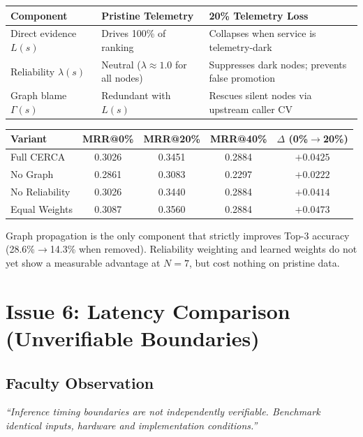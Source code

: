 \documentclass[11pt,a4paper]{article}
\newcommand{\tb}[1]{\textbf{#1}}
\begin{document}
\begin{center}\footnotesize
\begin{tabular}{|L{3.8cm}|L{4.0cm}|L{5.6cm}|}
\hline
\tb{Component} & \tb{Pristine Telemetry} & \tb{20\% Telemetry Loss} \\ \hline
Direct evidence $L(s)$ & Drives 100\% of ranking & Collapses when service is telemetry-dark \\ \hline
Reliability $\lambda(s)$ & Neutral ($\lambda\approx1.0$ for all nodes) & Suppresses dark nodes; prevents false promotion \\ \hline
Graph blame $\Gamma(s)$ & Redundant with $L(s)$ & Rescues silent nodes via upstream caller CV \\ \hline
\end{tabular}
\end{center}

\begin{center}\small
\begin{tabular}{|l|c|c|c|c|}
\hline
\tb{Variant} & \tb{MRR@0\%} & \tb{MRR@20\%} & \tb{MRR@40\%} & \tb{$\Delta$ (0\%$\to$20\%)} \\ \hline
Full CERCA & 0.3026 & 0.3451 & 0.2884 & $+0.0425$ \\ \hline
No Graph & 0.2861 & 0.3083 & 0.2297 & $+0.0222$ \\ \hline
No Reliability & 0.3026 & 0.3440 & 0.2884 & $+0.0414$ \\ \hline
Equal Weights & 0.3087 & 0.3560 & 0.2884 & $+0.0473$ \\ \hline
\end{tabular}
\end{center}

Graph propagation is the only component that strictly improves Top-3 accuracy (28.6\%$\to$14.3\% when removed). Reliability weighting and learned weights do not yet show a measurable advantage at $N=7$, but cost nothing on pristine data.

\section{Issue 6: Latency Comparison (Unverifiable Boundaries)}

\subsection{Faculty Observation}
\textit{``Inference timing boundaries are not independently verifiable. Benchmark identical inputs, hardware and implementation conditions.''}
\end{document}
